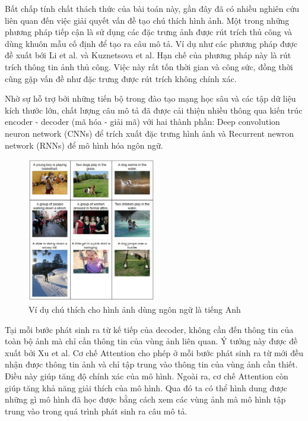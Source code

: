 \documentclass[conference]{IEEEtran}
\begin{document}
Bất chấp tính chất thách thức của bài toán này, gần đây đã có nhiều nghiên cứu liên quan đến việc giải quyết vấn đề tạo chú thích hình ảnh.
Một trong những phương pháp tiếp cận là sử dụng các đặc trưng ảnh được rút trích thủ công và dùng khuôn mẫu cố định để tạo ra câu mô tả. Ví dụ như các phương pháp được đề xuất bới Li et al.\cite{li2011composing} và Kuznetsova et al.\cite{kuznetsova2014treetalk}
Hạn chế của phương pháp này là  rút trích thông tin ảnh thủ công. Việc này rất tốn thời gian và công sức, đồng thời cũng gặp vấn đề như đặc trưng được rút trích không chính xác.

Nhờ sự hỗ trợ bởi những tiến bộ trong đào tạo mạng học sâu\cite{krizhevsky2017imagenet} và các tập dữ liệu kích thước lớn\cite{russakovsky2015imagenet}, chất lượng câu mô tả đã được cải thiện nhiều thông qua kiến trúc encoder - decoder (mã hóa - giải mã) với hai thành phần: Deep convolution neuron network (CNNs) để trích xuất đặc trưng hình ảnh và Recurrent newron network (RNNs) để mô hình hóa ngôn ngữ.

\begin{figure}[t]
\includegraphics[width=0.5\textwidth]{assets/example.jpg}
  \caption{Ví dụ chú thích cho hình ảnh dùng ngôn ngữ là tiếng Anh}
  \label{fig:example}
\end{figure}

Tại mỗi bước phát sinh ra từ kế tiếp của decoder, không cần đến thông tin của toàn bộ ảnh mà chỉ cần thông tin của vùng ảnh liên quan. Ý tưởng này được đề xuất bởi Xu et al.\cite{xu2015show}
 Cơ chế Attention cho phép ở mỗi bước phát sinh ra từ mới đều nhận được thông tin ảnh và chỉ tập trung vào thông tin của vùng ảnh cần thiết. Điều này giúp tăng độ chính xác của mô hình.
 Ngoài ra, cơ chế Attention còn giúp tăng khả năng giải thích của mô hình.
 Qua đó ta có thể hình dung được những gì mô hình đã học được bằng cách xem các vùng ảnh mà mô hình tập trung vào trong quá trình phát sinh ra câu mô tả.
\end{document}
